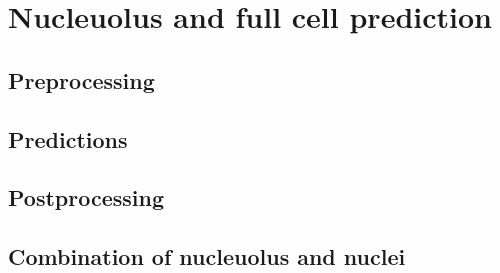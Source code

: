 \section{Nucleuolus and full cell prediction}
    \subsection{Preprocessing}
    \subsection{Predictions}
    \subsection{Postprocessing}
    \subsection{Combination of nucleuolus and nuclei}